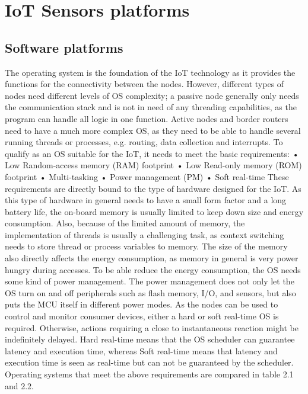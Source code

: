 \section{IoT Sensors platforms}

\subsection{Software platforms}


The operating system is the foundation of the IoT technology as it provides the functions for the connectivity between the nodes.
However,
	different types of nodes need different levels of OS complexity;
	a passive node generally only needs the communication stack and is not in need of any threading capabilities,
	as the program can handle all logic in one function.
Active nodes and border routers need to have a much more complex OS,
	as they need to be able to handle several running threads or processes,
	e.g.
routing,
	data collection and interrupts.
To qualify as an OS suitable for the IoT,
	it needs to meet the basic requirements:
	• Low Random-access memory (RAM) footprint 
	• Low Read-only memory (ROM) footprint 
	• Multi-tasking • Power management (PM) 
	• Soft real-time These requirements are directly bound to the type of hardware designed for the IoT.
As this type of hardware in general needs to have a small form factor and a long battery life,
	the on-board memory is usually limited to keep down size and energy consumption.
Also,
	because of the limited amount of memory,
	the implementation of threads is usually a challenging task,
	as context switching needs to store thread or process variables to memory.
The size of the memory also directly affects the energy consumption,
	as memory in general is very power hungry during accesses.
To be able reduce the energy consumption,
	the OS needs some kind of power management.
The power management does not only let the OS turn on and off peripherals such as flash memory,
	I/O,
	and sensors,
	but also puts the MCU itself in different power modes.
As the nodes can be used to control and monitor consumer devices,
	either a hard or soft real-time OS is required.
Otherwise,
	actions requiring a close to instantaneous reaction might be indefinitely delayed.
Hard real-time means that the OS scheduler can guarantee latency and execution time,
	whereas Soft real-time means that latency and execution time is seen as real-time but can not be guaranteed by the scheduler.
Operating systems that meet the above requirements are compared in table 2.1 and 2.2.

